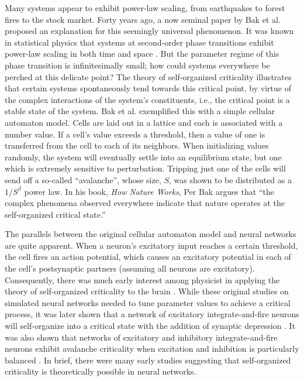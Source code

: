 Many systems appear to exhibit power-law scaling, from earthquakes to forest fires to the stock market. Forty years ago, a now seminal paper by Bak et al. \cite{Bak1987} proposed an explanation for this seemingly universal phenomenon. It was known in statistical physics that systems at second-order phase transitions exhibit power-law scaling in both time and space \cite{pathria2016statistical}. But the parameter regime of this phase transition is infinitesimally small; how could systems everywhere be perched at this delicate point? The theory of self-organized criticality illustrates that certain systems spontaneously tend towards this critical point, by virtue of the complex interactions of the system's constituents, i.e., the critical point is a stable state of the system. Bak et al. \cite{Bak1987} exemplified this with a simple cellular automaton model. Cells are laid out in a lattice and each is associated with a number value. If a cell’s value exceeds a threshold, then a value of one is transferred from the cell to each of its neighbors. When initializing values randomly, the system will eventually settle into an equilibrium state, but one which is extremely sensitive to perturbation. Tripping just one of the cells will send off a so-called ``avalanche'', whose size, $S$, was shown to be distributed as a $1/S^\beta$ power law. In his book, \textit{How Nature Works}\cite{Bak1996}, Per Bak argues that ``the complex phenomena observed everywhere indicate that nature operates at the self-organized critical state.''

The parallels between the original cellular automaton model and neural networks are quite apparent. When a neuron’s excitatory input reaches a certain threshold, the cell fires an action potential, which causes an excitatory potential in each of the cell’s postsynaptic partners (assuming all neurons are excitatory). Consequently, there was much early interest among physicist in applying the theory of self-organized criticality to the brain \cite{Corral1995, Herz1995}. While these original studies on simulated neural networks needed to tune parameter values to achieve a critical process, it was later shown that a network of excitatory integrate-and-fire neurons will self-organize into a critical state with the addition of synaptic depression \cite{Levina2007}. It was also shown that networks of excitatory and inhibitory integrate-and-fire neurons exhibit avalanche criticality when excitation and inhibition is particularly balanced \cite{Poil2012, Lombardi2017}. In brief, there were many early studies suggesting that self-organized criticality is theoretically possible in neural networks.


